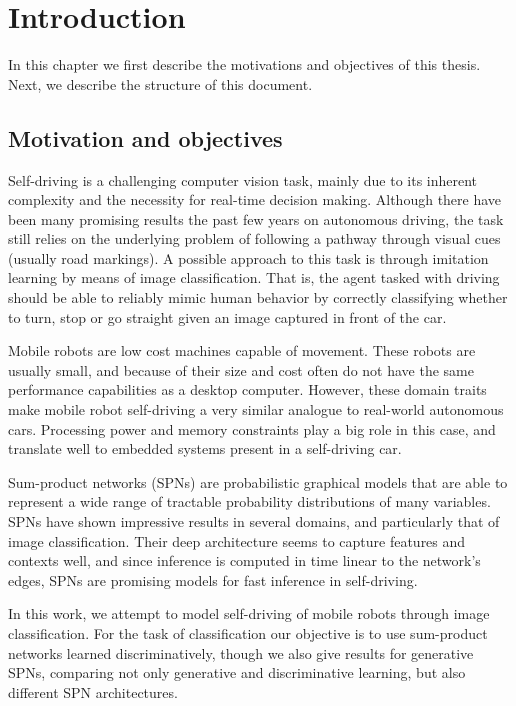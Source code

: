 
\chapter{Introduction}\label{chp:introduction}

In this chapter we first describe the motivations and objectives of this thesis. Next, we describe
the structure of this document.

\section{Motivation and objectives}

Self-driving is a challenging computer vision task, mainly due to its inherent complexity and the
necessity for real-time decision making. Although there have been many promising results the past
few years on autonomous driving, the task still relies on the underlying problem of following a
pathway through visual cues (usually road markings). A possible approach to this task is through
imitation learning by means of image classification. That is, the agent tasked with driving should
be able to reliably mimic human behavior by correctly classifying whether to turn, stop or go
straight given an image captured in front of the car.

Mobile robots are low cost machines capable of movement. These robots are usually small, and
because of their size and cost often do not have the same performance capabilities as a desktop
computer. However, these domain traits make mobile robot self-driving a very similar analogue to
real-world autonomous cars. Processing power and memory constraints play a big role in this case,
and translate well to embedded systems present in a self-driving car.

Sum-product networks (SPNs) are probabilistic graphical models that are able to represent a wide
range of tractable probability distributions of many variables. SPNs have shown impressive results
in several domains, and particularly that of image classification. Their deep architecture seems to
capture features and contexts well, and since inference is computed in time linear to the network's
edges, SPNs are promising models for fast inference in self-driving.

In this work, we attempt to model self-driving of mobile robots through image classification. For
the task of classification our objective is to use sum-product networks learned discriminatively,
though we also give results for generative SPNs, comparing not only generative and discriminative
learning, but also different SPN architectures.

